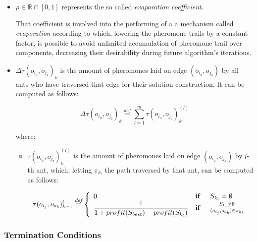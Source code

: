 \documentclass[12pt,a4paper]{report}
\newcommand{\mathDef}{\overset{\textit{def}}{=}}
\begin{document}
\begin{itemize}
	
	\item $\rho \in \mathbb{R} \cap \left[0,1\right]$ represents the so called \textit{evaporation coefficient}. 
	
	That coefficient is involved into the performing of a a mechanism called \textit{evaporation} according to which, lowering the pheromone trails by a constant factor, is possible to avoid unlimited accumulation of pheromone trail over components, decreasing their desirability during future algorithm's iterations.
	
	\item $\Delta \tau(o_{i_a}, o_{j_b})_{k}$ is the amount of pheromones laid on edge $(o_{i_a}, o_{j_b})$ by all ants who have traversed that edge for their solution construction. It can be computed as follows:
	
	\begin{equation}
		\Delta \tau(o_{i_a}, o_{j_b})_{k} \mathDef \sum_{l=1}^{m} \tau(o_{i_a}, o_{j_b})_k^{(l)}
	\end{equation}
	
	where: 
	
	\begin{itemize}
		\item $\tau(o_{i_a}, o_{j_b})_k^{(l)}$ is the amount of pheromones laid on edge $(o_{i_a}, o_{j_b})$ by $l$-th ant, which, letting $\pi_{k_l}$ the path traversed by that ant, can be computed as follows:
		
		\begin{equation}
			\tau(o_{i_j}, o_{a_b})_{k-1}^{l} \mathDef \left\{ 
			\begin{array}{lll}
				0 & \text{\textbf{if }} & S_{k_l} = \emptyset \\ 
				\displaystyle \frac{1}{1 + profit(S_{best}) - profit(S_{k_l})} & \text{\textbf{if }} & \substack{S_{k_l} \neq \emptyset \\ (o_{i_j}, o_{a_b}) \in \pi_{k_l}} \\ 
			\end{array} \right.
		\end{equation}
		
	\end{itemize}
\end{itemize}

\subsubsection{Termination Conditions}
\end{document}
